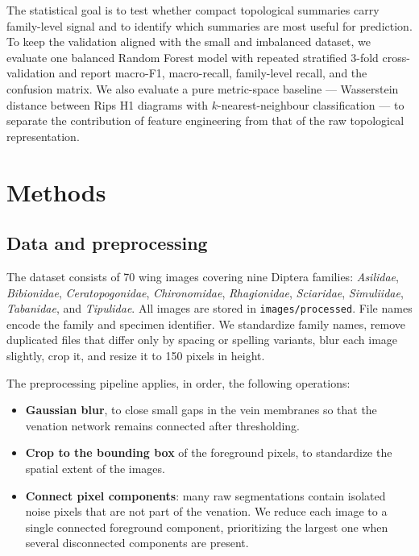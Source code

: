 \documentclass[
  a4paper,
  DIV=11,
  numbers=noendperiod]{scrartcl}
\providecommand{\tightlist}{%
  \setlength{\itemsep}{0pt}\setlength{\parskip}{0pt}}
\begin{document}
The statistical goal is to test whether compact topological summaries
carry family-level signal and to identify which summaries are most
useful for prediction. To keep the validation aligned with the small and
imbalanced dataset, we evaluate one balanced Random Forest model with
repeated stratified 3-fold cross-validation and report macro-F1,
macro-recall, family-level recall, and the confusion matrix. We also
evaluate a pure metric-space baseline --- Wasserstein distance between
Rips H1 diagrams with \(k\)-nearest-neighbour classification --- to
separate the contribution of feature engineering from that of the raw
topological representation.

\section{Methods}\label{methods}

\subsection{Data and preprocessing}\label{data-and-preprocessing}

The dataset consists of 70 wing images covering nine Diptera families:
\emph{Asilidae}, \emph{Bibionidae}, \emph{Ceratopogonidae},
\emph{Chironomidae}, \emph{Rhagionidae}, \emph{Sciaridae},
\emph{Simuliidae}, \emph{Tabanidae}, and \emph{Tipulidae}. All images
are stored in \texttt{images/processed}. File names encode the family
and specimen identifier. We standardize family names, remove duplicated
files that differ only by spacing or spelling variants, blur each image
slightly, crop it, and resize it to 150 pixels in height.

The preprocessing pipeline applies, in order, the following operations:

\begin{itemize}
\tightlist
\item
  \textbf{Gaussian blur}, to close small gaps in the vein membranes so
  that the venation network remains connected after thresholding.
\item
  \textbf{Crop to the bounding box} of the foreground pixels, to
  standardize the spatial extent of the images.
\item
  \textbf{Connect pixel components}: many raw segmentations contain
  isolated noise pixels that are not part of the venation. We reduce
  each image to a single connected foreground component, prioritizing
  the largest one when several disconnected components are present.
\end{itemize}
\end{document}
